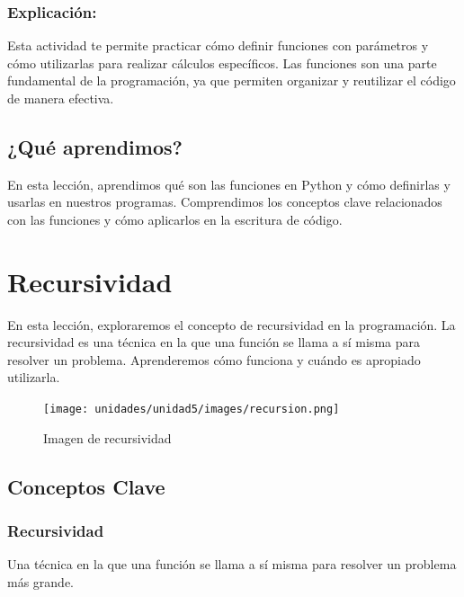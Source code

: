 \documentclass[
  a4paper,
  DIV=11,
  numbers=noendperiod,
  onepage,
  openany]{scrreprt}
\begin{document}
\subsection{Explicación:}\label{explicaciuxf3n-33}

Esta actividad te permite practicar cómo definir funciones con
parámetros y cómo utilizarlas para realizar cálculos específicos. Las
funciones son una parte fundamental de la programación, ya que permiten
organizar y reutilizar el código de manera efectiva.

\section{¿Qué aprendimos?}\label{quuxe9-aprendimos-11}

En esta lección, aprendimos qué son las funciones en Python y cómo
definirlas y usarlas en nuestros programas. Comprendimos los conceptos
clave relacionados con las funciones y cómo aplicarlos en la escritura
de código.

\chapter{Recursividad}\label{recursividad}

En esta lección, exploraremos el concepto de recursividad en la
programación. La recursividad es una técnica en la que una función se
llama a sí misma para resolver un problema. Aprenderemos cómo funciona y
cuándo es apropiado utilizarla.

\begin{figure}

{\centering \texttt{[image: unidades/unidad5/images/recursion.png]}

}

\caption{Imagen de recursividad}

\end{figure}

\section{Conceptos Clave}\label{conceptos-clave-21}

\subsection{Recursividad}\label{recursividad-1}

Una técnica en la que una función se llama a sí misma para resolver un
problema más grande.
\end{document}
